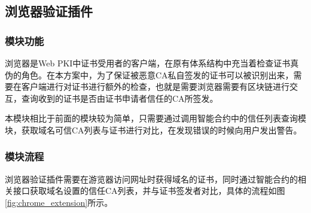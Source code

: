 






	



\subsection{浏览器验证插件}

\subsubsection{模块功能}

浏览器是Web PKI中证书受用者的客户端，在原有体系结构中充当着检查证书真伪的角色。在本方案中，为了保证被恶意CA私自签发的证书可以被识别出来，需要在客户端进行对证书进行额外的检查，也就是需要浏览器需要有区块链进行交互，查询收到的证书是否由证书申请者信任的CA所签发。

本模块相比于前面的模块较为简单，只需要通过调用智能合约中的信任列表查询模块，获取域名可信CA列表与证书进行对比，在发现错误的时候向用户发出警告。

\subsubsection{模块流程}

浏览器验证插件需要在游览器访问网址时获得域名的证书，同时通过智能合约的相关接口获取域名设置的信任CA列表，并与证书签发者对比，具体的流程如图\ref{fig:chrome_extension}所示。

